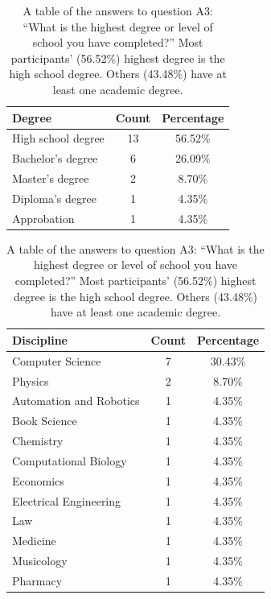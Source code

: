 \begin{table}[H]
	\centering
	\begin{subtable}[b]{.48\textwidth}
		\footnotesize
		\centering
		\begin{tabular}[b]{l c c}
			\toprule
			Degree             & Count & Percentage \\
			\midrule
			High school degree & 13    & 56.52\%    \\
			Bachelor's degree  & 6     & 26.09\%    \\
			Master's degree    & 2     & 8.70\%     \\
			Diploma's degree   & 1     & 4.35\%     \\
			Approbation        & 1     & 4.35\%     \\
			\bottomrule
		\end{tabular}
		\caption{A table of the answers to question A3: \enquote{What is the highest degree or level of school you have completed?} Most participants' (56.52\%) highest degree is the high school degree. Others (43.48\%) have at least one academic degree.}\label{tab:sus-degree}
  \end{subtable}%
  \hspace{0.04\textwidth}%
	\begin{subtable}[b]{.48\textwidth}
		\footnotesize
		\centering
		\begin{tabular}[b]{l c c}
			\toprule
			Discipline              & Count & Percentage \\
			\midrule
			Computer Science        & 7     & 30.43\%    \\
			Physics                 & 2     & 8.70\%     \\
			Automation and Robotics & 1     & 4.35\%     \\
			Book Science            & 1     & 4.35\%     \\
			Chemistry               & 1     & 4.35\%     \\
			Computational Biology   & 1     & 4.35\%     \\
			Economics               & 1     & 4.35\%     \\
			Electrical Engineering  & 1     & 4.35\%     \\
			Law                     & 1     & 4.35\%     \\
			Medicine                & 1     & 4.35\%     \\
			Musicology              & 1     & 4.35\%     \\
			Pharmacy                & 1     & 4.35\%     \\

\end{tabular}
\end{subtable}
\end{table}
